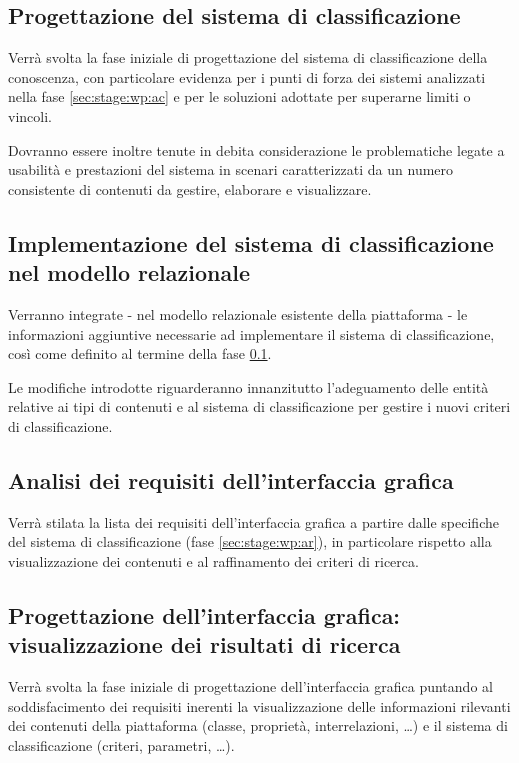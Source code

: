 \documentclass[10pt,a4paper,hidelinks]{scrartcl} %
\begin{document}
	\subsection{Progettazione del sistema di classificazione}
	\label{sec:stage:wp:design}
	Verrà svolta la fase iniziale di progettazione del sistema di classificazione della conoscenza, con particolare evidenza per i punti di forza dei sistemi analizzati nella fase \ref{sec:stage:wp:ac} e per le soluzioni adottate per superarne limiti o vincoli.

	Dovranno essere inoltre tenute in debita considerazione le problematiche legate a usabilità e prestazioni del sistema in scenari caratterizzati da un numero consistente di contenuti da gestire, elaborare e visualizzare.
	
	\subsection{Implementazione del sistema di classificazione nel modello relazionale}
	\label{sec:stage:wp:build}
	Verranno integrate - nel modello relazionale esistente della piattaforma - le informazioni aggiuntive necessarie ad implementare il sistema di classificazione, così come definito al termine della fase \ref{sec:stage:wp:design}.

	Le modifiche introdotte riguarderanno innanzitutto l'adeguamento delle entità relative ai tipi di contenuti e al sistema di classificazione per gestire i nuovi criteri di classificazione.

	\subsection{Analisi dei requisiti dell'interfaccia grafica}
	\label{sec:stage:wp:ui:ar}
	Verrà stilata la lista dei requisiti dell'interfaccia grafica a partire dalle specifiche del sistema di classificazione (fase \ref{sec:stage:wp:ar}), in particolare rispetto alla visualizzazione dei contenuti e al raffinamento dei criteri di ricerca.

	\subsection{Progettazione dell'interfaccia grafica: visualizzazione dei risultati di ricerca}
	\label{sec:stage:wp:ui:design}
	Verrà svolta la fase iniziale di progettazione dell'interfaccia grafica puntando al soddisfacimento dei requisiti inerenti la visualizzazione delle informazioni rilevanti dei contenuti della piattaforma (classe, proprietà, interrelazioni, \ldots) e il sistema di classificazione (criteri, parametri, \ldots).
\end{document}
